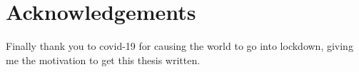 \chapter*{Acknowledgements}
Finally thank you to covid-19 for causing the world to go into lockdown, giving me the motivation to get this thesis written.